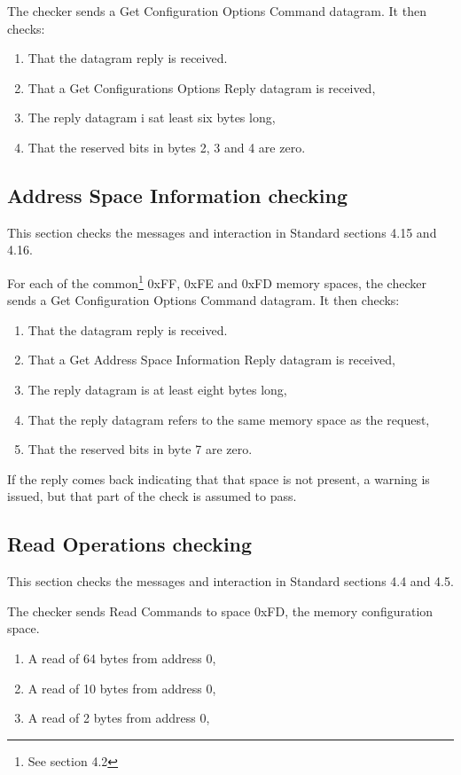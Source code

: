 \documentclass[11pt]{article}
\begin{document}
The checker sends a Get Configuration Options Command datagram.  It then checks:
\begin{enumerate}
\item That the datagram reply is received.
\item That a Get Configurations Options Reply datagram is received,
\item The reply datagram i sat least six bytes long,
\item That the reserved bits in bytes 2, 3 and 4 are zero.
\end{enumerate}

\subsection{Address Space Information checking}

This section checks the messages and interaction in Standard sections 4.15 and 4.16.

For each of the common\footnote{See section 4.2}
0xFF, 0xFE and 0xFD memory spaces, the
checker sends a Get Configuration Options Command datagram.  It then checks:
\begin{enumerate}
\item That the datagram reply is received.
\item That a Get Address Space Information Reply datagram is received,
\item The reply datagram is at least eight bytes long,
\item That the reply datagram refers to the same memory space as the request,
\item That the reserved bits in byte 7 are zero.
\end{enumerate}

If the reply comes back indicating that that space is not present, 
a warning is issued, but that part of the check is assumed to pass.

\subsection{Read Operations checking}

This section checks the messages and interaction in Standard sections 4.4 and 4.5.

The checker sends Read Commands to space 0xFD, the memory configuration space.

\begin{enumerate}
\item A read of 64 bytes from address 0,
\item A read of 10 bytes from address 0,
\item A read of 2 bytes from address 0,
\end{enumerate}
\end{document}
